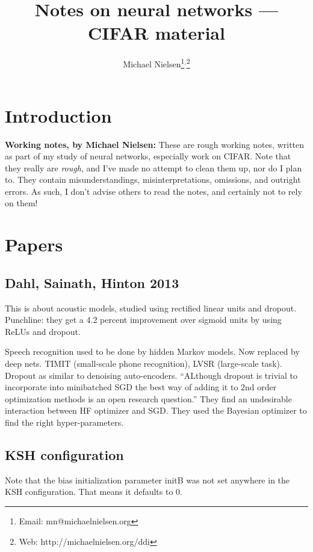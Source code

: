 \documentclass[12pt]{report}
\begin{document}
\title{Notes on neural networks --- CIFAR material}
\author{Michael Nielsen\thanks{Email: mn@michaelnielsen.org}$^{,}$\thanks{Web: http://michaelnielsen.org/ddi}}

\maketitle

\chapter{Introduction}

\textbf{Working notes, by Michael Nielsen:} These are rough working
notes, written as part of my study of neural networks, especially work
on CIFAR.  Note that they really are \emph{rough}, and I've made no
attempt to clean them up, nor do I plan to.  They contain
misunderstandings, misinterpretations, omissions, and outright errors.
As such, I don't advise others to read the notes, and certainly not to
rely on them!

\chapter{Papers}

\section{Dahl, Sainath, Hinton 2013}

This is about acoustic models, studied using rectified linear units
and dropout.  Punchline: they get a 4.2 percent improvement over
sigmoid units by using ReLUs and dropout.

Speech recognition used to be done by hidden Markov models.  Now
replaced by deep nets.  TIMIT (small-scale phone recognition), LVSR
(large-scale task).  Dropout as similar to denoising auto-encoders.
``ALthough dropout is trivial to incorporate into minibatched SGD the
best way of adding it to 2nd order optimization methods is an open
research question.''  They find an undesirable interaction between HF
optimizer and SGD.  They used the Bayesian optimizer to find the right
hyper-parameters.


\section{KSH configuration}


Note that the bias initialization parameter initB was not set anywhere
in the KSH configuration.  That means it defaults to 0.
\end{document}
